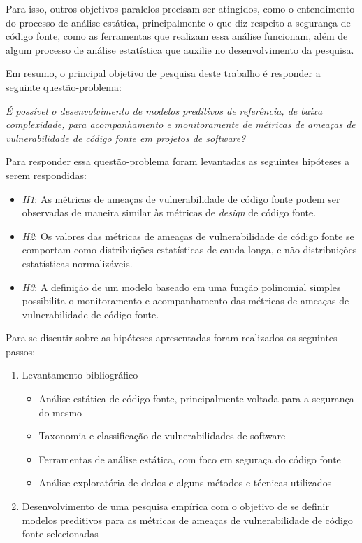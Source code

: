 Para isso, outros objetivos paralelos precisam ser atingidos, como o
entendimento do processo de análise estática, principalmente o que diz respeito
a segurança de código fonte, como as ferramentas que realizam essa análise
funcionam, além de algum processo de análise estatística que auxilie no
desenvolvimento da pesquisa.

Em resumo, o principal objetivo de pesquisa deste trabalho é responder a
seguinte questão-problema:

\begin{center}
  \textit{É possível o desenvolvimento de modelos preditivos de referência, de
  baixa complexidade, para acompanhamento e monitoramente de métricas de ameaças
de vulnerabilidade de código fonte em projetos de software?}
\end{center}

Para responder essa questão-problema foram levantadas as seguintes hipóteses
a serem respondidas:

\begin{itemize}
  \item \textit{H1}: As métricas de ameaças de vulnerabilidade de código fonte
  podem ser observadas de maneira similar às métricas de \textit{design} de código
  fonte.

  \item \textit{H2}: Os valores das métricas de ameaças de vulnerabilidade de
    código fonte se comportam como distribuições estatísticas de cauda longa, e
    não distribuições estatísticas normalizáveis.

  \item \textit{H3}: A definição de um modelo baseado em uma função polinomial
   simples possibilita o monitoramento e acompanhamento das métricas de ameaças
   de vulnerabilidade de código fonte.
\end{itemize}

Para se discutir sobre as hipóteses apresentadas foram realizados os seguintes
passos:

\begin{enumerate}
  \item Levantamento bibliográfico
    \begin{itemize}
      \item Análise estática de código fonte, principalmente voltada para a
        segurança do mesmo
      \item Taxonomia e classificação de vulnerabilidades de software
      \item Ferramentas de análise estática, com foco em seguraça do código
        fonte
      \item Análise exploratória de dados e alguns métodos e técnicas utilizados
    \end{itemize}

  \item Desenvolvimento de uma pesquisa empírica com o objetivo de se definir
    modelos preditivos para as métricas de ameaças de vulnerabilidade de código
    fonte selecionadas
\end{enumerate}

